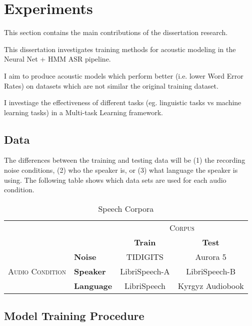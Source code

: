 \documentclass[10pt,a4paper]{article}
\begin{document}
\section{Experiments}

This section contains the main contributions of the dissertation research.

This dissertation investigates training methods for acoustic modeling in the Neural Net + HMM ASR pipeline.

I aim to produce acoustic models which perform better (i.e. lower Word Error Rates) on datasets which are not similar the original training dataset.

I investiage the effectiveness of different tasks (eg. linguistic tasks vs machine learning tasks) in a Multi-task Learning framework.


\subsection{Data}

The differences between the training and testing data will be (1) the recording noise conditions, (2) who the speaker is, or (3) what language the speaker is using. The following table shows which data sets are used for each audio condition.


\begin{table}[htbp]
  \centering
  \begin{adjustbox}{width=.75\textwidth}
    \begin{tabular}{clcc}
      \toprule
      && \multicolumn{2}{c}{\textsc{Corpus}}\\
      && \textbf{Train} & \textbf{Test}\\
      \midrule
      \multirow{3}{*}{\textsc{Audio Condition}} &\textbf{Noise} & TIDIGITS & Aurora 5 \\
      &\textbf{Speaker} & LibriSpeech-A & LibriSpeech-B \\
      &\textbf{Language} & LibriSpeech & Kyrgyz Audiobook \\
      \bottomrule
    \end{tabular}
    \label{table:data}
  \end{adjustbox}
  
  \caption{Speech Corpora}
  
\end{table}


\subsection{Model Training Procedure}
\end{document}
